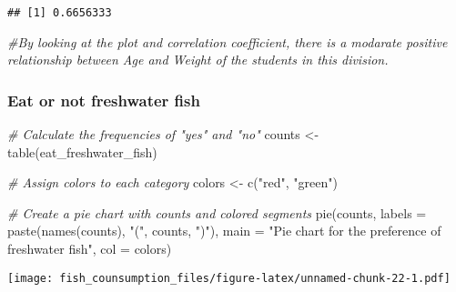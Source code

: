 \documentclass[
]{article}
\newenvironment{Shaded}{\begin{snugshade}}{\end{snugshade}}
\newcommand{\AttributeTok}[1]{\textcolor[rgb]{0.77,0.63,0.00}{#1}}
\newcommand{\CommentTok}[1]{\textcolor[rgb]{0.56,0.35,0.01}{\textit{#1}}}
\newcommand{\FunctionTok}[1]{\textcolor[rgb]{0.00,0.00,0.00}{#1}}
\newcommand{\NormalTok}[1]{#1}
\newcommand{\OtherTok}[1]{\textcolor[rgb]{0.56,0.35,0.01}{#1}}
\newcommand{\SpecialCharTok}[1]{\textcolor[rgb]{0.00,0.00,0.00}{#1}}
\newcommand{\StringTok}[1]{\textcolor[rgb]{0.31,0.60,0.02}{#1}}
\begin{document}
\begin{Shaded}
\end{Shaded}

\begin{verbatim}
## [1] 0.6656333
\end{verbatim}

\begin{Shaded}
\begin{Highlighting}[]
\CommentTok{\#By looking at the plot and correlation coefficient, there is a modarate positive relationship between Age and Weight of the students in this division. }
\end{Highlighting}
\end{Shaded}

\hypertarget{eat-or-not-freshwater-fish}{%
\subsubsection{Eat or not freshwater
fish}\label{eat-or-not-freshwater-fish}}

\begin{Shaded}
\begin{Highlighting}[]
\CommentTok{\# Calculate the frequencies of "yes" and "no"}
\NormalTok{counts }\OtherTok{\textless{}{-}} \FunctionTok{table}\NormalTok{(eat\_freshwater\_fish)}

\CommentTok{\# Assign colors to each category}
\NormalTok{colors }\OtherTok{\textless{}{-}} \FunctionTok{c}\NormalTok{(}\StringTok{"red"}\NormalTok{, }\StringTok{"green"}\NormalTok{)}

\CommentTok{\# Create a pie chart with counts and colored segments}
\FunctionTok{pie}\NormalTok{(counts, }\AttributeTok{labels =} \FunctionTok{paste}\NormalTok{(}\FunctionTok{names}\NormalTok{(counts), }\StringTok{"("}\NormalTok{, counts, }\StringTok{")"}\NormalTok{), }
    \AttributeTok{main =} \StringTok{"Pie chart for the preference of freshwater fish"}\NormalTok{, }\AttributeTok{col =}\NormalTok{ colors)}
\end{Highlighting}
\end{Shaded}

\texttt{[image: fish\_counsumption\_files/figure-latex/unnamed-chunk-22-1.pdf]}
\end{document}
